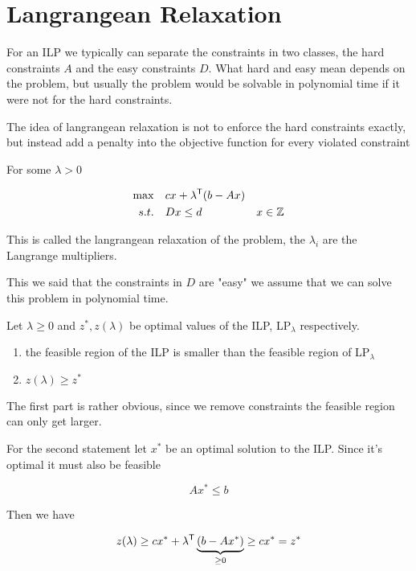 \section{Langrangean Relaxation}

For an ILP we typically can separate the constraints in two classes, the hard constraints $A$ and the easy constraints $D$. What hard and easy mean depends on the problem, but usually the problem would be solvable in polynomial time if it were not for the hard constraints.

The idea of langrangean relaxation is not to enforce the hard constraints exactly, but instead add a penalty into the objective function for every violated constraint

For some $\lambda>0$

\begin{align*}
\max \quad & c x + {\lambda}^\text{\upshape \sffamily T}(b-Ax)\\
s.t. \quad & Dx \leq d
	& x\in \mathbb{Z}
\end{align*}

This is called the langrangean relaxation of the problem, the $\lambda_i$ are the Langrange multipliers.

This we said that the constraints in $D$ are "easy" we assume that we can solve this problem in polynomial time.

\begin{thm} Let $\lambda \geq 0$ and $z^*,z(\lambda)$ be optimal values of the ILP, LP$_\lambda$ respectively.

\begin{enumerate}
\item the feasible region of the ILP is smaller than the feasible region of LP$_\lambda$
\item $z(\lambda)\geq z^*$
\end{enumerate}
\end{thm}

\begin{pr} The first part is rather obvious, since we remove constraints the feasible region can only get larger.

For the second statement let $x^*$ be an optimal solution to the ILP. Since it's optimal it must also be feasible

\[Ax^*\leq b\]

Then we have

\[z(\lambda) \geq cx^* + {\lambda}^\text{\upshape \sffamily T}\underbrace{(b-Ax^*)}_{\geq 0} \geq cx^*=z^*\]
\end{pr}

